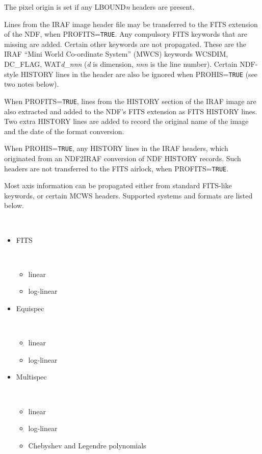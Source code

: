 \documentclass[twoside,11pt]{article}
\newcommand{\latex}[1]{#1}
\newcommand{\ssthitemlist}[1]{
  \latex{
  \mbox{} \\
  \vspace{-3.5ex}
  }
  \begin{itemize}
     #1
  \end{itemize}
}
\newcommand{\sstitem}{\item}
\newcommand{\sstitem}{\item}
\begin{document}
{{{         \sstitem
         The pixel origin is set if any LBOUND\textit{n} headers are present.

         \sstitem
         Lines from the IRAF image header file may be transferred to
         the FITS extension of the NDF, when PROFITS=\texttt{TRUE}.  Any
         compulsory FITS keywords that are missing are added.  Certain
         other keywords are not propagated.  These are the IRAF ``Mini
         World Co-ordinate System'' (MWCS) keywords WCSDIM, DC\_FLAG,
         WAT\textit{d}\_\textit{nnn} (\textit{d} is dimension, \textit{nnn}
         is the line number).
         Certain NDF-style HISTORY lines in the header are also
         be ignored when PROHIS=\texttt{TRUE} (see two notes below).

         \sstitem
         When PROFITS=\texttt{TRUE}, lines from the HISTORY section of the IRAF
         image are also extracted and added to the NDF's FITS extension as
         FITS HISTORY lines.  Two extra HISTORY lines are added to record
         the original name of the image and the date of the format
         conversion.

         \sstitem
         When PROHIS=\texttt{TRUE}, any HISTORY lines in the IRAF headers, which
         originated from an NDF2IRAF conversion of NDF HISTORY records.
         Such headers are not transferred to the FITS airlock, when
         PROFITS=\texttt{TRUE}.

         \sstitem
         Most axis information can be propagated either from standard
         FITS-like keywords, or certain MCWS headers.  Supported systems
         and formats are listed below.
         \ssthitemlist{

            \sstitem
            FITS
            \ssthitemlist{
               \sstitem
               linear

               \sstitem
               log-linear
            }

            \sstitem
            Equispec
            \ssthitemlist{

               \sstitem
               linear

               \sstitem
               log-linear
            }

            \sstitem
            Multispec
            \ssthitemlist{

               \sstitem
               linear

               \sstitem
               log-linear

               \sstitem
               Chebyshev and Legendre polynomials

}}}}}
\end{document}
